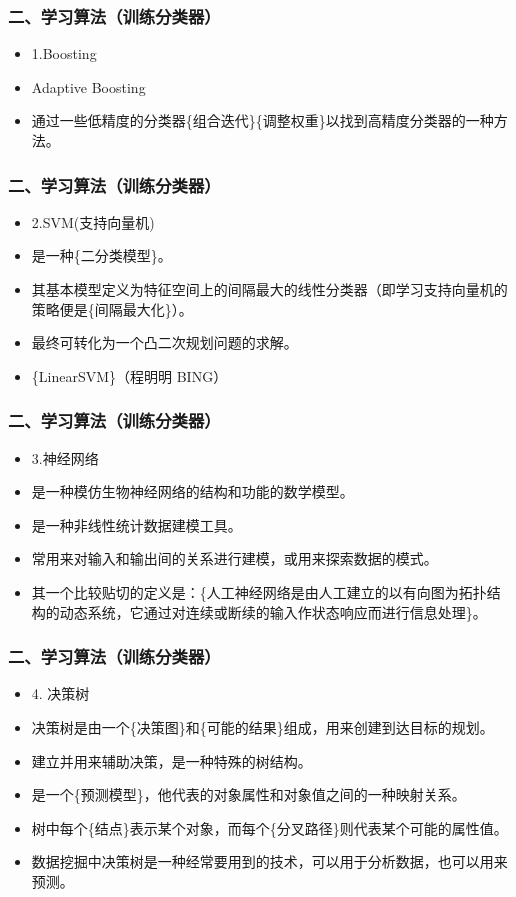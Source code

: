 \documentclass[notheorems,mathserif,table,compress]{beamer}  %
\begin{document}
\begin{frame}
  \frametitle{二、学习算法（训练分类器）}
  \begin{itemize}
  \item 1.Boosting
  \item Adaptive Boosting
  \item 通过一些低精度的分类器\{组合迭代\}\{调整权重\}以找到高精度分类器的一种方法。
  \end{itemize}
\end{frame}

\begin{frame}
  \frametitle{二、学习算法（训练分类器）}
  \begin{itemize}
  \item 2.SVM(支持向量机) 
  \item 是一种\{二分类模型\}。
  \item 其基本模型定义为特征空间上的间隔最大的线性分类器（即学习支持向量机的策略便是\{间隔最大化\}）。
  \item 最终可转化为一个凸二次规划问题的求解。
  \item \{LinearSVM\}（程明明 BING）
  \end{itemize}
\end{frame}

\begin{frame}
  \frametitle{二、学习算法（训练分类器）}
  \begin{itemize}
  \item 3.神经网络
  \item 是一种模仿生物神经网络的结构和功能的数学模型。 
  \item 是一种非线性统计数据建模工具。 
  \item 常用来对输入和输出间的关系进行建模，或用来探索数据的模式。
  \item 其一个比较贴切的定义是：\{人工神经网络是由人工建立的以有向图为拓扑结构的动态系统，它通过对连续或断续的输入作状态响应而进行信息处理\}。
  \end{itemize}
\end{frame}

\begin{frame}
  \frametitle{二、学习算法（训练分类器）}
  \begin{itemize}
  \item 4. 决策树
  \item 决策树是由一个\{决策图\}和\{可能的结果\}组成，用来创建到达目标的规划。  
  \item 建立并用来辅助决策，是一种特殊的树结构。 
  \item 是一个\{预测模型\}，他代表的对象属性和对象值之间的一种映射关系。 
  \item 树中每个\{结点\}表示某个对象，而每个\{分叉路径\}则代表某个可能的属性值。  
  \item 数据挖掘中决策树是一种经常要用到的技术，可以用于分析数据，也可以用来预测。
  \end{itemize}
\end{frame}
\end{document}
